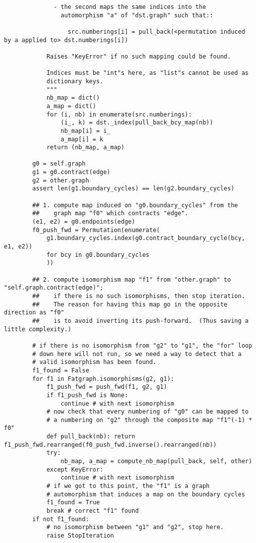 \begin{lstlisting}
              - the second maps the same indices into the
                automorphism "a" of "dst.graph" such that::

                  src.numberings[i] = pull_back(<permutation induced by a applied to> dst.numberings[i])

            Raises "KeyError" if no such mapping could be found.

            Indices must be "int"s here, as "list"s cannot be used as
            dictionary keys.
            """
            nb_map = dict()
            a_map = dict()
            for (i, nb) in enumerate(src.numberings):
                (i_, k) = dst._index(pull_back_bcy_map(nb))
                nb_map[i] = i_
                a_map[i] = k
            return (nb_map, a_map)

        g0 = self.graph
        g1 = g0.contract(edge)
        g2 = other.graph
        assert len(g1.boundary_cycles) == len(g2.boundary_cycles)
        
        ## 1. compute map induced on "g0.boundary_cycles" from the
        ##    graph map "f0" which contracts "edge".
        (e1, e2) = g0.endpoints(edge)
        f0_push_fwd = Permutation(enumerate(
            g1.boundary_cycles.index(g0.contract_boundary_cycle(bcy, e1, e2))
            for bcy in g0.boundary_cycles
            ))

        ## 2. compute isomorphism map "f1" from "other.graph" to "self.graph.contract(edge)";
        ##    if there is no such isomorphisms, then stop iteration.
        ##    The reason for having this map go in the opposite direction as "f0"
        ##    is to avoid inverting its push-forward.  (Thus saving a little complexity.)

        # if there is no isomorphism from "g2" to "g1", the "for" loop
        # down here will not run, so we need a way to detect that a
        # valid isomorphism has been found.
        f1_found = False
        for f1 in Fatgraph.isomorphisms(g2, g1):
            f1_push_fwd = push_fwd(f1, g2, g1)
            if f1_push_fwd is None:
                continue # with next isomorphism
            # now check that every numbering of "g0" can be mapped to
            # a numbering on "g2" through the composite map "f1^(-1) * f0"
            def pull_back(nb): return f1_push_fwd.rearranged(f0_push_fwd.inverse().rearranged(nb))
            try:
                nb_map, a_map = compute_nb_map(pull_back, self, other)
            except KeyError:
                continue # with next isomorphism
            # if we got to this point, the "f1" is a graph
            # automorphism that induces a map on the boundary cycles
            f1_found = True
            break # correct "f1" found
        if not f1_found:
            # no isomorphism between "g1" and "g2", stop here.
            raise StopIteration


\end{lstlisting}
